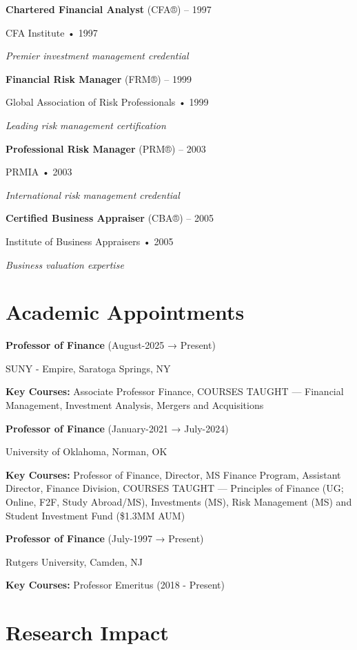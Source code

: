 \documentclass[11pt,a4paper,]{awesome-cv}
\begin{document}
\textbf{Chartered Financial Analyst} (CFA®) -- 1997

CFA Institute • 1997

\textit{Premier investment management credential}

\textbf{Financial Risk Manager} (FRM®) -- 1999

Global Association of Risk Professionals • 1999

\textit{Leading risk management certification}

\textbf{Professional Risk Manager} (PRM®) -- 2003

PRMIA • 2003

\textit{International risk management credential}

\textbf{Certified Business Appraiser} (CBA®) -- 2005

Institute of Business Appraisers • 2005

\textit{Business valuation expertise}

\section{Academic Appointments}\label{academic-appointments}

\textbf{Professor of Finance} (August-2025 → Present)

SUNY - Empire, Saratoga Springs, NY

\textbf{Key Courses:} Associate Professor Finance, COURSES TAUGHT ---
Financial Management, Investment Analysis, Mergers and Acquisitions

\textbf{Professor of Finance} (January-2021 → July-2024)

University of Oklahoma, Norman, OK

\textbf{Key Courses:} Professor of Finance, Director, MS Finance
Program, Assistant Director, Finance Division, COURSES TAUGHT ---
Principles of Finance (UG; Online, F2F, Study Abroad/MS), Investments
(MS), Risk Management (MS) and Student Investment Fund (\$1.3MM AUM)

\textbf{Professor of Finance} (July-1997 → Present)

Rutgers University, Camden, NJ

\textbf{Key Courses:} Professor Emeritus (2018 - Present)

\section{Research Impact}\label{research-impact}
\end{document}
